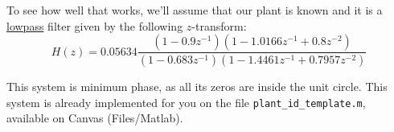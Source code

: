 \documentclass[12pt]{report}
\newcommand\SimpleSys[4]{%
	\def\xin{#2}%
	\def\Hz{#3}%
	\def\yout{#4}
}
\begin{document}
\begin{center}
	\resizebox{0.4\linewidth}{!}{\SimpleSys{../lectures/figs/simple_in_dsp_out}{$x[n]$}{$H(z) = ??$}{$y[n]$}}
\end{center}


To see how well that works, we'll assume that our plant is known and it is a \underline{lowpass} filter given by the following $z$-transform:
\begin{equation}
H(z) = 0.05634\frac{(1-0.9z^{-1})(1 -1.0166z^{-1} + 0.8z^{-2})}{(1-0.683z^{-1})(1 -1.4461z^{-1} + 0.7957z^{-2})}
\end{equation}

This system is minimum phase, as all its zeros are inside the unit circle. This system is already implemented for you on the file \texttt{plant\_id\_template.m}, available on Canvas (Files/Matlab).
\end{document}
